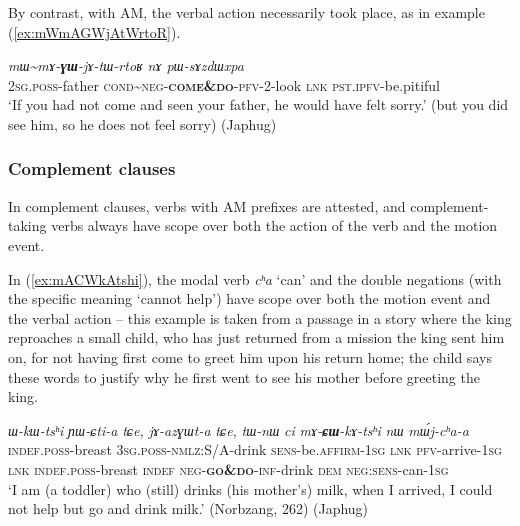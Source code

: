 \documentclass[oneside,a4paper,11pt]{article}
\newcommand{\ipa}[1]{{\phon\textit{#1}}}
\newcommand{\japhug}[2]{\textit{\phon#1} `#2'}
\newcommand{\redp}{\textasciitilde}
\newcommand{\rouge}[1]{\textbf{#1}}
\begin{document}
By contrast, with AM, the verbal action necessarily took place, as in example (\ref{ex:mWmAGWjAtWrtoR}).

\begin{exe}
\ex \label{ex:mWmAGWjAtWrtoR}
\gll \ipa{nɤ-wa}	\ipa{mɯ\redp{}mɤ-\rouge{ɣɯ}-jɤ-tɯ-rtoʁ}	\ipa{nɤ}	\ipa{pɯ-sɤzdɯxpa} \\
\textsc{2sg.poss}-father \textsc{cond}\redp{}\textsc{neg}-\rouge{\textsc{come\&do}}-\textsc{pfv}-2-look \textsc{lnk} \textsc{pst.ipfv}-be.pitiful \\ 
\glt `If you had not come and seen your father, he would have felt sorry.' (but you did see him, so he does not feel sorry) (Japhug)
\end{exe}

\subsubsection{Complement clauses} \label{sec:am.complement}
In complement clauses, verbs with AM prefixes are attested, and complement-taking verbs always have scope over both the action of the verb and the motion event.

 
In (\ref{ex:mACWkAtshi}), the modal verb \japhug{cʰa}{can} and the double negations (with the specific meaning `cannot help') have scope over both the motion event and the verbal action -- this example is taken from a passage in a story where the king reproaches a small child, who has just returned from a mission the king sent him on, for not having first come to greet him upon his return home; the child says these words to justify why he first went to see his mother before greeting the king.

\begin{exe}
\ex \label{ex:mACWkAtshi}
\gll  \ipa{tɯ-nɯ}	\ipa{ɯ-kɯ-tsʰi}	\ipa{ɲɯ-ɕti-a}	\ipa{tɕe,}	\ipa{jɤ-azɣɯt-a}	\ipa{tɕe,}	\ipa{tɯ-nɯ}	\ipa{ci}	\ipa{mɤ-\rouge{ɕɯ}-kɤ-tsʰi}	\ipa{nɯ}	\ipa{mɯ́j-cʰa-a}  \\
\textsc{indef}.\textsc{poss}-breast \textsc{3sg}.\textsc{poss}-\textsc{nmlz}:S/A-drink \textsc{sens}-be.\textsc{affirm}-\textsc{1sg} \textsc{lnk} \textsc{pfv}-arrive-\textsc{1sg} \textsc{lnk} \textsc{indef}.\textsc{poss}-breast  \textsc{indef} \textsc{neg}-\rouge{\textsc{go\&do}}-\textsc{inf}-drink \textsc{dem} \textsc{neg}:\textsc{sens}-can-\textsc{1sg} \\
\glt `I am (a toddler) who (still) drinks (his mother's) milk, when I arrived, I could not help but go and drink milk.'  (Norbzang, 262) (Japhug)
 \end{exe}
 
\end{document}
